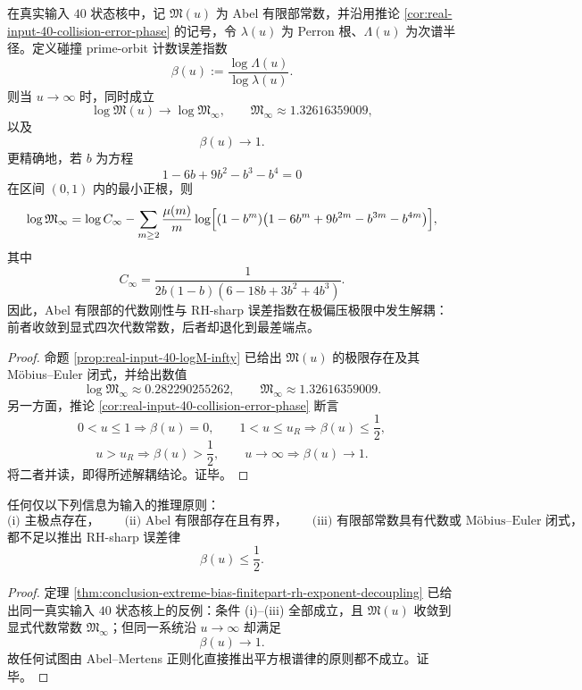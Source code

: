 \begin{theorem}\label{thm:conclusion-extreme-bias-finitepart-rh-exponent-decoupling}
在真实输入 \(40\) 状态核中，记 \(\mathfrak M(u)\) 为 Abel 有限部常数，并沿用推论 \ref{cor:real-input-40-collision-error-phase} 的记号，令 \(\lambda(u)\) 为 Perron 根、\(\Lambda(u)\) 为次谱半径。定义碰撞 prime-orbit 计数误差指数
\[
\beta(u):=\frac{\log\Lambda(u)}{\log\lambda(u)}.
\]
则当 \(u\to\infty\) 时，同时成立
\[
\log\mathfrak M(u)\longrightarrow \log\mathfrak M_\infty,
\qquad
\mathfrak M_\infty\approx 1.32616359009,
\]
以及
\[
\beta(u)\longrightarrow 1.
\]
更精确地，若 \(b\) 为方程
\[
1-6b+9b^2-b^3-b^4=0
\]
在区间 \((0,1)\) 内的最小正根，则
\[
\log\mathfrak M_\infty
=
\log C_\infty
-\sum_{m\ge 2}\frac{\mu(m)}{m}
\log\Bigl[(1-b^m)\bigl(1-6b^m+9b^{2m}-b^{3m}-b^{4m}\bigr)\Bigr],
\]
其中
\[
C_\infty=\frac{1}{2b(1-b)(6-18b+3b^2+4b^3)}.
\]
因此，Abel 有限部的代数刚性与 RH-sharp 误差指数在极偏压极限中发生解耦：前者收敛到显式四次代数常数，后者却退化到最差端点。
\end{theorem}
\begin{proof}
命题 \ref{prop:real-input-40-logM-infty} 已给出 \(\mathfrak M(u)\) 的极限存在及其 Möbius--Euler 闭式，并给出数值
\[
\log\mathfrak M_\infty\approx 0.282290255262,
\qquad
\mathfrak M_\infty\approx 1.32616359009.
\]
另一方面，推论 \ref{cor:real-input-40-collision-error-phase} 断言
\[
0<u\le 1\Rightarrow \beta(u)=0,\qquad
1<u\le u_R\Rightarrow \beta(u)\le \frac12,
\]
\[
u>u_R\Rightarrow \beta(u)>\frac12,
\qquad
u\to\infty\Rightarrow \beta(u)\to 1.
\]
将二者并读，即得所述解耦结论。证毕。
\end{proof}

\begin{corollary}\label{cor:conclusion-abel-mertens-regularization-not-rhsharp}
任何仅以下列信息为输入的推理原则：
\[
\text{(i) 主极点存在，}\qquad
\text{(ii) Abel 有限部存在且有界，}\qquad
\text{(iii) 有限部常数具有代数或 Möbius--Euler 闭式，}
\]
都不足以推出 RH-sharp 误差律
\[
\beta(u)\le \frac12.
\]
\end{corollary}
\begin{proof}
定理 \ref{thm:conclusion-extreme-bias-finitepart-rh-exponent-decoupling} 已给出同一真实输入 \(40\) 状态核上的反例：条件 (i)--(iii) 全部成立，且 \(\mathfrak M(u)\) 收敛到显式代数常数 \(\mathfrak M_\infty\)；但同一系统沿 \(u\to\infty\) 却满足
\[
\beta(u)\to 1.
\]
故任何试图由 Abel--Mertens 正则化直接推出平方根谱律的原则都不成立。证毕。
\end{proof}

